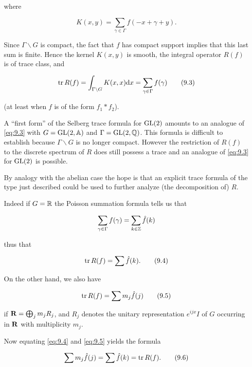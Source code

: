 where

\begin{equation}\label{eq:9.2}
K(x, y) = \sum_{\gamma \in \Gamma} f(-x + \gamma + y).\tag{9.2}
\end{equation}

Since $\Gamma \backslash G$ is compact, the fact that $f$ has compact support implies that this last sum is finite. Hence the kernel $K(x,y)$ is smooth, the integral operator $R(f)$ is of trace class, and

\begin{equation}\label{eq:9.3}
\operatorname{tr} R(f) = \int_{\Gamma \backslash G} K(x, x)\mathrm{d} x = \sum_{\gamma \in \Gamma} f(\gamma)\tag{9.3}
\end{equation}

(at least when $f$ is of the form $f_1 * f_2$).

A ``first form'' of the Selberg trace formula for $\operatorname{GL}(2)$ amounts to an analogue of \eqref{eq:9.3} with $G = \operatorname{GL}(2,\mathbb{A})$ and $\Gamma = \operatorname{GL}(2,\mathbb{Q})$. This formula is difficult to establish because $\Gamma \backslash G$ is no longer compact. However the restriction of $R(f)$ to the discrete spectrum of $R$ does still possess a trace and an analogue of \eqref{eq:9.3} for $\operatorname{GL}(2)$ is possible.

By analogy with the abelian case the hope is that an explicit trace formula of the type just described could be used to further analyze (the decomposition of) $R$.

Indeed if $G = \mathbb{R}$ the Poisson summation formula tells us that

\[
\sum_{\gamma \in \Gamma} f(\gamma) = \sum_{k \in \mathbb{Z}} \hat{f}(k)
\]

thus that

\begin{equation}\label{eq:9.4}
\operatorname{tr} R(f) = \sum \hat{f}(k).\tag{9.4}
\end{equation}

On the other hand, we also have

\begin{equation}\label{eq:9.5}
\operatorname{tr} R(f) = \sum m_j \hat{f}(j)\tag{9.5}
\end{equation}

if $\mathbf{R} = \bigoplus_j m_j R_j$, and $R_j$ denotes the unitary representation $e^{ijx}I$ of $G$ occurring in $\mathbf{R}$ with multiplicity $m_j$.

Now equating \eqref{eq:9.4} and \eqref{eq:9.5} yields the formula

\begin{equation}\label{eq:9.6}
\sum m_j \hat{f}(j) = \sum \hat{f}(k) = \operatorname{tr} R(f).\tag{9.6}
\end{equation}

